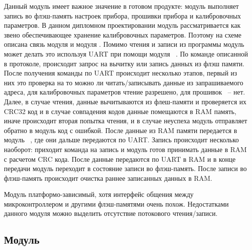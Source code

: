 Данный модуль имеет важное значение в готовом продукте: модуль \moduleFlashMemory выполняет запись во флэш-память настроек прибора,
прошивки прибора и калибровочных параметров. В данном дипломном проектировании модуль \moduleFlashMemory рассматривается как звено
обеспечивающее хранение калибровочных параметров. Поэтому на схеме описана связь модуля \moduleFlashMemory и модуля \moduleCalib.
Помимо чтения и записи из программы модуль может делать это используя UART при помощи модуля \moduleUart~.
По команде описанной в протоколе, происходит запрос на вычитку или запись данных из флэш памяти.
После получения команды по UART происходит несколько этапов, первый из них это проверка на то можно ли читать/записывать данные из запрашиваемого адреса,
для калибровочных параметров чтение разрешено, для прошивок ~-- нет. Далее, в случае чтения, данные вычитываются из флеш-памяти и проверяется их CRC32
код и в случае совпадения кодов данные помещаются в RAM память, иначе происходит вторая попытка чтения, и в случае неуспеха модуль отправляет обратно в 
модуль \moduleUart код с ошибкой. После данные из RAM памяти передается в модуль \moduleUart~, где они дальше передаются по UART. Запись происходит несколько наоборот:
приходит команда на запись и модуль \moduleFlashMemory готов принимать данные в RAM с расчетом CRC кода. После данные передаются по UART в RAM и в конце передачи модуль переходит в состояние
записи во флэш-память. После записи во флэш-память происходит очистка раннее записанных данных в RAM.

Модуль платформо-зависимый, хотя интерфейс общения между микроконтроллером и другими 
флэш-памятями очень похож. Недостатками данного модуля можно выделить отсутствие потокового чтения/записи.


\subsection{Модуль \moduleFlashMemory}


